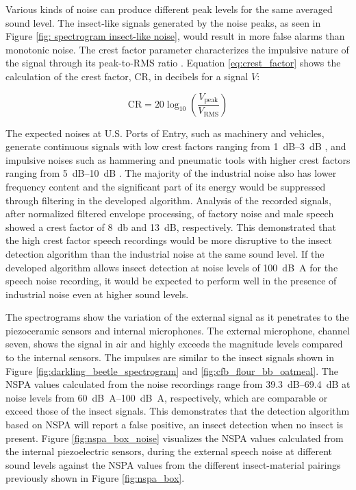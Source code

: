 \documentclass[../Vibro-Acoustic Signatures and Detection Algorithms for Stored Product Insects.tex]{subfiles}
\begin{document}
\newpage

Various kinds of noise can produce different peak levels for the same averaged sound level. The insect-like signals generated by the noise peaks, as seen in Figure \ref{fig: spectrogram insect-like noise}, would result in more false alarms than monotonic noise. The crest factor parameter characterizes the impulsive nature of the signal through its peak-to-RMS ratio \cite{kowalska-koczwaraInfluenceCrestFactor2018}. Equation \ref{eq:crest_factor} shows the calculation of the crest factor, CR, in decibels for a signal $V$: 

\begin{equation}
	\label{eq:crest_factor}
	\text{CR} = 20 \log_{10}(\frac{V_\text{peak}}{V_\text{RMS}})
\end{equation}

The expected noises at U.S. Ports of Entry, such as machinery and vehicles, generate continuous signals with low crest factors ranging from \SIrange{1}{3}{\deci\bel} \cite{starckIndustrialImpulseNoise1987,bergerNoiseManual2003}, and impulsive noises such as hammering and pneumatic tools with higher crest factors ranging from \SIrange{5}{10}{\deci\bel} \cite{starckIndustrialImpulseNoise1987}. The majority of the industrial noise also has lower frequency content \cite{salomonsPracticalRangesLoudness2011} and the significant part of its energy would be suppressed through filtering in the developed algorithm. Analysis of the recorded signals, after normalized filtered envelope processing, of factory noise \cite{viertelnachvierFactory22014, inspectorjAmbienceMachineFactory2017} and male speech showed a crest factor of \SI{8}{\decibel} and \SI{13}{\deci\bel}, respectively. This demonstrated that the high crest factor speech recordings would be more disruptive to the insect detection algorithm than the industrial noise at the same sound level. If the developed algorithm allows insect detection at noise levels of \SI{100}{\deci\bel A} for the speech noise recording, it would be expected to perform well in the presence of industrial noise even at higher sound levels. 

The spectrograms show the variation of the external signal as it penetrates to the piezoceramic sensors and internal microphones. The external microphone, channel seven, shows the signal in air and highly exceeds the magnitude levels compared to the internal sensors. The impulses are similar to the insect signals shown in Figure \ref{fig:darkling_beetle_spectrogram} and \ref{fig:cfb_flour_bb_oatmeal}. The NSPA values calculated from the noise recordings range from \SIrange{39.3}{69.4}{\deci\bel} at noise levels from \SIrange{60}{100}{\deci\bel A}, respectively, which are comparable or exceed those of the insect signals. This demonstrates that the detection algorithm based on NSPA will report a false positive, an insect detection when no insect is present. Figure \ref{fig:nspa_box_noise} visualizes the NSPA values calculated from the internal piezoelectric sensors, during the external speech noise at different sound levels against the NSPA values from the different insect-material pairings previously shown in Figure \ref{fig:nspa_box}.
\end{document}
